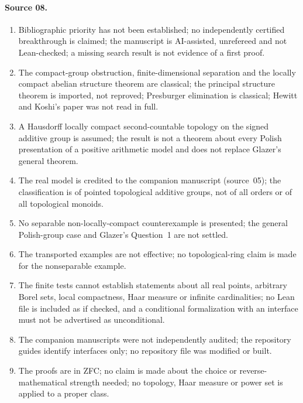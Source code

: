 \documentclass[11pt]{article}
\numberwithin{equation}{section}
\theoremstyle{definition}
\theoremstyle{remark}
\begin{document}
\paragraph{Source 08.}
\begin{enumerate}[label=08.\arabic*]
\item Bibliographic priority has not been established; no independently
certified breakthrough is claimed; the manuscript is AI-assisted, unrefereed
and not Lean-checked; a missing search result is not evidence of a first
proof.
\item The compact-group obstruction, finite-dimensional separation and the
locally compact abelian structure theorem are classical; the principal
structure theorem is imported, not reproved; Presburger elimination is
classical; Hewitt and Koshi's paper was not read in full.
\item A Hausdorff locally compact second-countable topology on the signed
additive group is assumed; the result is not a theorem about every Polish
presentation of a positive arithmetic model and does not replace Glazer's
general theorem.
\item The real model is credited to the companion manuscript (source~05); the
classification is of pointed topological additive groups, not of all orders
or of all topological monoids.
\item No separable non-locally-compact counterexample is presented; the
general Polish-group case and Glazer's Question~1 are not settled.
\item The transported examples are not effective; no topological-ring claim
is made for the nonseparable example.
\item The finite tests cannot establish statements about all real points,
arbitrary Borel sets, local compactness, Haar measure or infinite
cardinalities; no Lean file is included as if checked, and a conditional
formalization with an interface must not be advertised as unconditional.
\item The companion manuscripts were not independently audited; the repository
guides identify interfaces only; no repository file was modified or built.
\item The proofs are in ZFC; no claim is made about the choice or
reverse-mathematical strength needed; no topology, Haar measure or power set
is applied to a proper class.
\end{enumerate}
\end{document}
